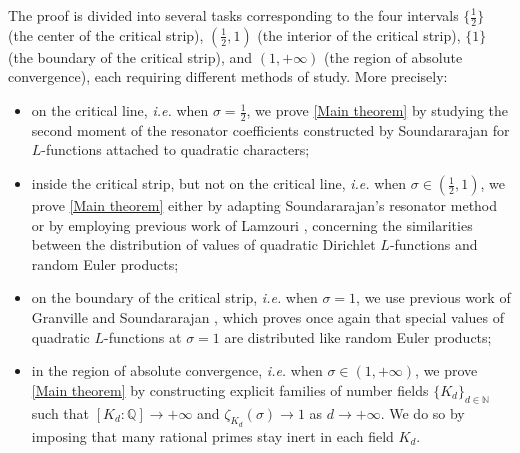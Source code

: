 \documentclass[10pt,a4paper]{amsart}
\theoremstyle{plain}
\theoremstyle{definition}
\theoremstyle{remark}
\begin{document}
The proof is divided into several tasks corresponding to the four intervals $\{\frac{1}{2}\}$ (the center of the critical strip), $(\frac{1}{2},1)$ (the interior of the critical strip), $\{1\}$ (the boundary of the critical strip), and $(1,+\infty)$ (the region of absolute convergence), each requiring different methods of study. More precisely:
\begin{itemize}
\item on the critical line, \textit{i.e.} when $\sigma=\frac{1}{2}$, we prove \cref{Main theorem} by studying the second moment of the resonator coefficients constructed by Soundararajan \cite{Soundararajan_2008} for $L$-functions attached to quadratic characters;
\item inside the critical strip, but not on the critical line, \textit{i.e.} when $\sigma \in (\frac{1}{2},1)$, we prove \cref{Main theorem} either by adapting Soundararajan's resonator method or by employing previous work of Lamzouri \cite{Lamzouri_2011}, concerning the similarities between the distribution of values of quadratic Dirichlet $L$-functions and random Euler products;
\item on the boundary of the critical strip, \textit{i.e.} when $\sigma = 1$, we use previous work of Granville and Soundararajan \cite{Granville_Soundararajan_2003}, which proves once again that special values of quadratic $L$-functions at $\sigma = 1$ are distributed like random Euler products;
\item in the region of absolute convergence, \textit{i.e.} when $\sigma \in (1,+\infty)$, we prove \cref{Main theorem} by constructing explicit families of number fields $\{ K_d \}_{d \in \mathbb{N}}$ such that $[K_d \colon \mathbb{Q}] \to +\infty$ and $\zeta_{K_d}(\sigma) \to 1$ as $d \to +\infty$. We do so by imposing that many rational primes stay inert in each field $K_d$.
\end{itemize}
\end{document}
